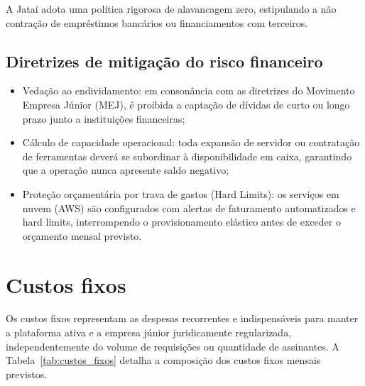 \documentclass[
  12pt,
  openright,
  oneside,
  a4paper,
  brazilian
]{abntex2}
\begin{document}
A Jataí adota uma política rigorosa de alavancagem zero, estipulando a não contração de empréstimos bancários ou financiamentos com terceiros.

\subsection{Diretrizes de mitigação do risco financeiro}
\begin{itemize}
    \item{Vedação ao endividamento:} em consonância com as diretrizes do Movimento Empresa Júnior (MEJ), é proibida a captação de dívidas de curto ou longo prazo junto a instituições financeiras;
    \item{Cálculo de capacidade operacional:} toda expansão de servidor ou contratação de ferramentas deverá se subordinar à disponibilidade em caixa, garantindo que a operação nunca apresente saldo negativo;
    \item{Proteção orçamentária por trava de gastos (Hard Limits):} os serviços em nuvem (AWS) são configurados com alertas de faturamento automatizados e hard limits, interrompendo o provisionamento elástico antes de exceder o orçamento mensal previsto.
\end{itemize}

\section{Custos fixos}
\label{sec:custos_fixos}

Os custos fixos representam as despesas recorrentes e indispensáveis para manter a plataforma ativa e a empresa júnior juridicamente regularizada, independentemente do volume de requisições ou quantidade de assinantes. A Tabela~\ref{tab:custos_fixos} detalha a composição dos custos fixos mensais previstos.

\begin{table}[htbp]
\centering
\caption{Estrutura mensal de custos fixos.}
\label{tab:custos_fixos}
\end{table}
\end{document}
